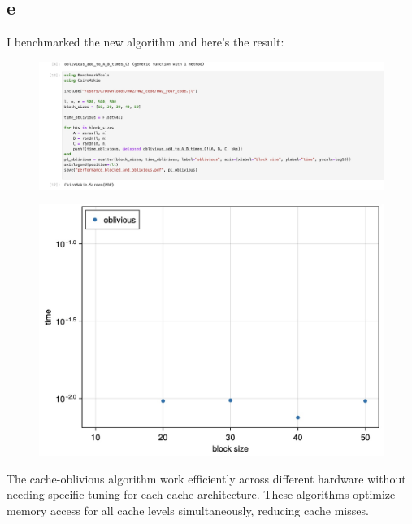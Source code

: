 \documentclass{article}
\begin{document}
\subsection{e}
I benchmarked the new algorithm and here's the result:
\begin{figure}[H]
    \centering
    \includegraphics[width=1\linewidth]{Photos/Image 2-6-24 at 11.52.jpeg}
\end{figure}
    \begin{figure}[H]
    \centering
    \includegraphics[width=0.75\linewidth]{Photos/Image 2-6-24 at 11.53.jpeg}
    \end{figure}
    The cache-oblivious algorithm work efficiently across different hardware without needing specific tuning for each cache architecture. These algorithms optimize memory access for all cache levels simultaneously, reducing cache misses.
\end{document}
